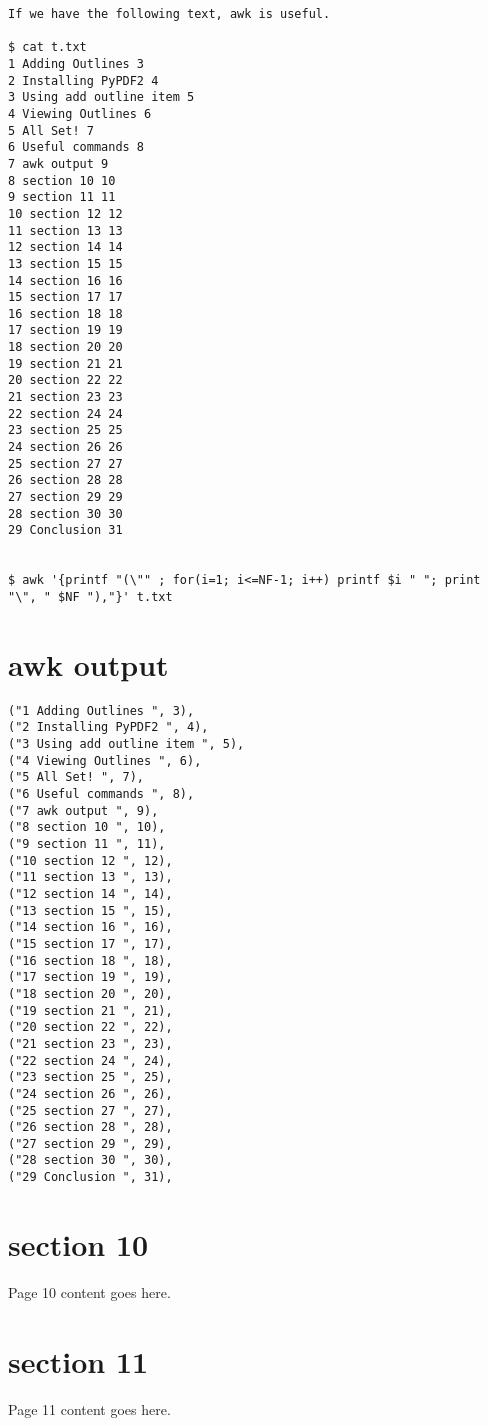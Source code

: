 \documentclass{article}
\begin{document}
\begin{verbatim}
If we have the following text, awk is useful.

$ cat t.txt
1 Adding Outlines 3
2 Installing PyPDF2 4
3 Using add outline item 5
4 Viewing Outlines 6
5 All Set! 7
6 Useful commands 8
7 awk output 9
8 section 10 10
9 section 11 11
10 section 12 12
11 section 13 13
12 section 14 14
13 section 15 15
14 section 16 16
15 section 17 17
16 section 18 18
17 section 19 19
18 section 20 20
19 section 21 21
20 section 22 22
21 section 23 23
22 section 24 24
23 section 25 25
24 section 26 26
25 section 27 27
26 section 28 28
27 section 29 29
28 section 30 30
29 Conclusion 31


$ awk '{printf "(\"" ; for(i=1; i<=NF-1; i++) printf $i " "; print "\", " $NF "),"}' t.txt
\end{verbatim}



\newpage

\section{awk output}

\begin{verbatim}
("1 Adding Outlines ", 3),
("2 Installing PyPDF2 ", 4),
("3 Using add outline item ", 5),
("4 Viewing Outlines ", 6),
("5 All Set! ", 7),
("6 Useful commands ", 8),
("7 awk output ", 9),
("8 section 10 ", 10),
("9 section 11 ", 11),
("10 section 12 ", 12),
("11 section 13 ", 13),
("12 section 14 ", 14),
("13 section 15 ", 15),
("14 section 16 ", 16),
("15 section 17 ", 17),
("16 section 18 ", 18),
("17 section 19 ", 19),
("18 section 20 ", 20),
("19 section 21 ", 21),
("20 section 22 ", 22),
("21 section 23 ", 23),
("22 section 24 ", 24),
("23 section 25 ", 25),
("24 section 26 ", 26),
("25 section 27 ", 27),
("26 section 28 ", 28),
("27 section 29 ", 29),
("28 section 30 ", 30),
("29 Conclusion ", 31),

\end{verbatim}


\newpage

\section{section 10}
Page 10 content goes here.
\newpage

\section{section 11}
Page 11 content goes here.
\newpage
\end{document}
